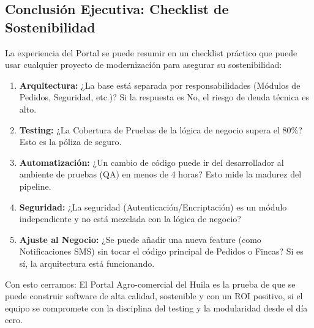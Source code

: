 \subsection{Conclusión Ejecutiva: Checklist de Sostenibilidad}

La experiencia del Portal se puede resumir en un checklist práctico que puede usar cualquier proyecto de modernización para asegurar su sostenibilidad:

\begin{enumerate}
\item \textbf{Arquitectura:} ¿La base está separada por responsabilidades (Módulos de Pedidos, Seguridad, etc.)? Si la respuesta es No, el riesgo de deuda técnica es alto.

\item \textbf{Testing:} ¿La Cobertura de Pruebas de la lógica de negocio supera el 80\%? Esto es la póliza de seguro.

\item \textbf{Automatización:} ¿Un cambio de código puede ir del desarrollador al ambiente de pruebas (QA) en menos de 4 horas? Esto mide la madurez del pipeline.

\item \textbf{Seguridad:} ¿La seguridad (Autenticación/Encriptación) es un módulo independiente y no está mezclada con la lógica de negocio?

\item \textbf{Ajuste al Negocio:} ¿Se puede añadir una nueva feature (como Notificaciones SMS) sin tocar el código principal de Pedidos o Fincas? Si es sí, la arquitectura está funcionando.
\end{enumerate}

Con esto cerramos: El Portal Agro-comercial del Huila es la prueba de que se puede construir software de alta calidad, sostenible y con un ROI positivo, si el equipo se compromete con la disciplina del testing y la modularidad desde el día cero.

